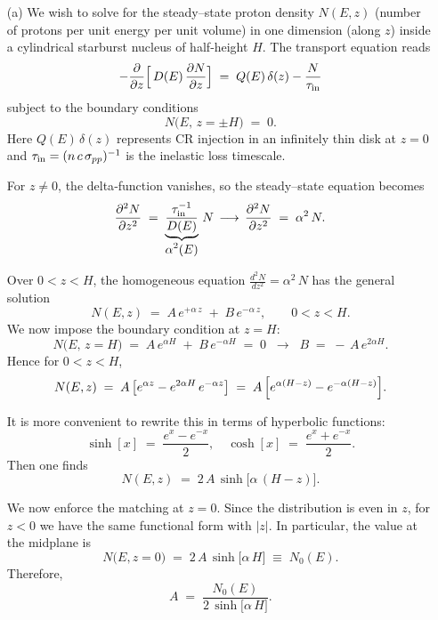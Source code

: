\begin{solution}
\begin{itemize}
\item[(a)] We wish to solve for the steady–state proton density \(N(E,z)\) (number of protons per unit energy per unit volume) in one dimension (along \(z\)) inside a cylindrical starburst nucleus of half‐height \(H\).  The transport equation reads
\begin{equation}\label{eq:transport21}
- \frac{\partial}{\partial z} \Bigl[\,D(E)\,\frac{\partial N}{\partial z}\Bigr]
\;=\;  
Q(E)\,\delta(z) - \frac{N}{\tau_{\rm in}}
\end{equation}
subject to the boundary conditions
\[
N\bigl(E,\,z = \pm H\bigr) \;=\; 0.
\]
Here \(Q(E)\,\delta(z)\) represents CR injection in an infinitely thin disk at \(z=0\) and \( \tau_{\rm in} = (n\,c\,\sigma_{pp})^{-1} \) is the inelastic loss timescale.

For \(z \neq 0\), the delta‐function vanishes, so the steady–state equation becomes
\[
\frac{\partial^2 N}{\partial z^2} \;=\; \underbrace{\frac{\tau^{-1}_{\rm in}}{D(E)}}_{\displaystyle \alpha^2(E)}\,N 
\, \longrightarrow \, 
\frac{\partial^2N}{\partial z^2} \;=\; \alpha^2\,N.
\]

Over \(0 < z < H\), the homogeneous equation 
\(\tfrac{d^2N}{dz^2} = \alpha^2\,N\)
has the general solution
\[
N(E,z)\;=\; A\,e^{+\alpha\,z} \;+\; B\,e^{-\alpha\,z}, 
\qquad 0<z<H.
\]
We now impose the boundary condition at \(z=H\):
\[
N\bigl(E,\,z=H\bigr) \;=\; A\,e^{\alpha H} \;+\; B\,e^{-\alpha H} \;=\; 0 
\;\;\longrightarrow\;\; 
B \;=\; -\,A\,e^{2\alpha H}.
\]
Hence for \(0 < z < H\),
\[
N(E,z) 
\;=\; A\,\bigl[e^{\alpha z} - e^{2\alpha H}\,e^{-\alpha z}\bigr] 
\;=\; A\,\Bigl[e^{\alpha (H - z)} - e^{-\alpha (H - z)}\Bigr].
\]

It is more convenient to rewrite this in terms of hyperbolic functions:
\[
\sinh[x] \;=\; \frac{e^{x} - e^{-x}}{2}, 
\quad\cosh[x] \;=\; \frac{e^{x} + e^{-x}}{2}.
\]
Then one finds
\[
N(E,z) \;=\; 2\,A\,\sinh\bigl[\alpha\,(H - z)\bigr].
\]

We now enforce the matching at \(z=0\).  
%
Since the distribution is even in \(z\), for \(z<0\) we have the same functional form with \(|z|\).  In particular, the value at the midplane is
\[
N\bigl(E,z=0\bigr) 
\;=\; 2\,A\,\sinh\bigl[\alpha\,H\bigr]
\;\equiv\; N_0(E).
\]
Therefore,
\[
A \;=\; \frac{N_0(E)}{2\,\sinh\bigl[\alpha\,H\bigr]}.
\]


\end{itemize}
\end{solution}

